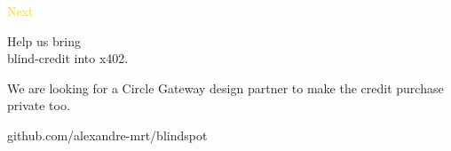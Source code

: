 \documentclass[aspectratio=169,12pt]{beamer}
\newcommand{\eyebrow}[1]{{\ttfamily\textcolor{gold}{#1}}\par\smallskip}
\begin{document}
\begin{frame}
  \vspace{0.8cm}
  \eyebrow{Next}
  {\pixel\fontsize{28}{34}\selectfont\color{sand} Help us bring\\ blind-credit into x402.\par}
  \bigskip
  {\large We are looking for a Circle Gateway design partner to make the credit purchase private too.\par}
  \vfill
  {\ttfamily\textcolor{sand}{github.com/alexandre-mrt/blindspot}}
  \vspace{0.9cm}
\end{frame}
\end{document}
